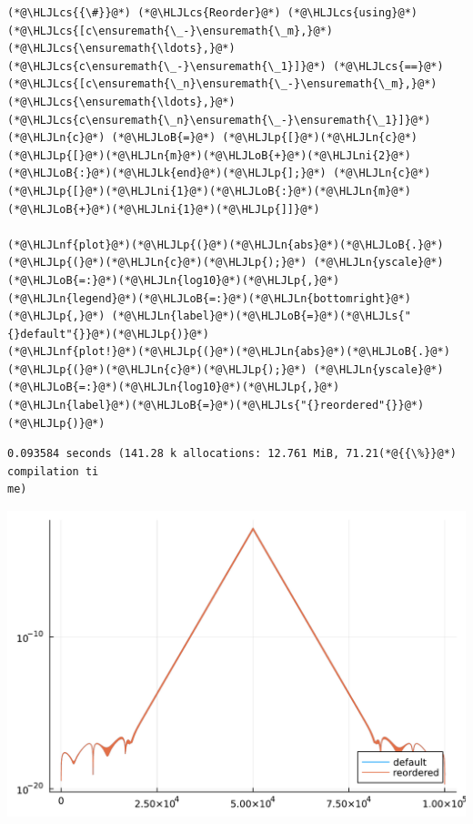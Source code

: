 \documentclass[12pt,landscape]{article}
\newcommand{\HLJLk}[1]{\textcolor[RGB]{148,91,176}{\textbf{#1}}}
\newcommand{\HLJLn}[1]{#1}
\newcommand{\HLJLnf}[1]{\textcolor[RGB]{66,102,213}{#1}}
\newcommand{\HLJLs}[1]{\textcolor[RGB]{201,61,57}{#1}}
\newcommand{\HLJLni}[1]{\textcolor[RGB]{59,151,46}{#1}}
\newcommand{\HLJLoB}[1]{\textcolor[RGB]{102,102,102}{\textbf{#1}}}
\newcommand{\HLJLp}[1]{#1}
\newcommand{\HLJLcs}[1]{\textcolor[RGB]{153,153,119}{\textit{#1}}}
\begin{document}
{\begin{lstlisting}
(*@\HLJLcs{{\#}}@*) (*@\HLJLcs{Reorder}@*) (*@\HLJLcs{using}@*) (*@\HLJLcs{[c\ensuremath{\_-}\ensuremath{\_m},}@*) (*@\HLJLcs{\ensuremath{\ldots},}@*) (*@\HLJLcs{c\ensuremath{\_-}\ensuremath{\_1}]}@*) (*@\HLJLcs{==}@*) (*@\HLJLcs{[c\ensuremath{\_n}\ensuremath{\_-}\ensuremath{\_m},}@*) (*@\HLJLcs{\ensuremath{\ldots},}@*) (*@\HLJLcs{c\ensuremath{\_n}\ensuremath{\_-}\ensuremath{\_1}]}@*)
(*@\HLJLn{c}@*) (*@\HLJLoB{=}@*) (*@\HLJLp{[}@*)(*@\HLJLn{c}@*)(*@\HLJLp{[}@*)(*@\HLJLn{m}@*)(*@\HLJLoB{+}@*)(*@\HLJLni{2}@*)(*@\HLJLoB{:}@*)(*@\HLJLk{end}@*)(*@\HLJLp{];}@*) (*@\HLJLn{c}@*)(*@\HLJLp{[}@*)(*@\HLJLni{1}@*)(*@\HLJLoB{:}@*)(*@\HLJLn{m}@*)(*@\HLJLoB{+}@*)(*@\HLJLni{1}@*)(*@\HLJLp{]]}@*)

(*@\HLJLnf{plot}@*)(*@\HLJLp{(}@*)(*@\HLJLn{abs}@*)(*@\HLJLoB{.}@*)(*@\HLJLp{(}@*)(*@\HLJLn{c}@*)(*@\HLJLp{);}@*) (*@\HLJLn{yscale}@*)(*@\HLJLoB{=:}@*)(*@\HLJLn{log10}@*)(*@\HLJLp{,}@*) (*@\HLJLn{legend}@*)(*@\HLJLoB{=:}@*)(*@\HLJLn{bottomright}@*)(*@\HLJLp{,}@*) (*@\HLJLn{label}@*)(*@\HLJLoB{=}@*)(*@\HLJLs{"{}default"{}}@*)(*@\HLJLp{)}@*)
(*@\HLJLnf{plot!}@*)(*@\HLJLp{(}@*)(*@\HLJLn{abs}@*)(*@\HLJLoB{.}@*)(*@\HLJLp{(}@*)(*@\HLJLn{c}@*)(*@\HLJLp{);}@*) (*@\HLJLn{yscale}@*)(*@\HLJLoB{=:}@*)(*@\HLJLn{log10}@*)(*@\HLJLp{,}@*) (*@\HLJLn{label}@*)(*@\HLJLoB{=}@*)(*@\HLJLs{"{}reordered"{}}@*)(*@\HLJLp{)}@*)
\end{lstlisting}

\begin{lstlisting}
0.093584 seconds (141.28 k allocations: 12.761 MiB, 71.21(*@{{\%}}@*) compilation ti
me)
\end{lstlisting}

\includegraphics[width=\linewidth]{jl_qsW2Qg/Fourier_7_1.pdf}

}
\end{document}
